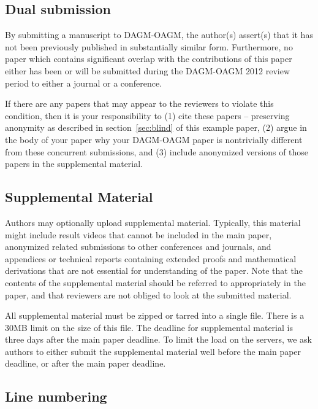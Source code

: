 \documentclass[runningheads]{llncs}
\begin{document}
\subsection{Dual submission}

By submitting a manuscript to DAGM-OAGM, the author(s) assert(s) that it has
not been previously published in substantially similar
form. Furthermore, no paper which contains significant overlap with
the contributions of this paper either has been or will be submitted
during the DAGM-OAGM 2012 review period to either a journal or a
conference.

If there are any papers that may appear to the reviewers to violate
this condition, then it is your responsibility to (1) cite these
papers -- preserving anonymity as described in section~\ref{sec:blind}
of this example paper, (2) argue in the body of your paper why your
DAGM-OAGM paper is nontrivially different from these concurrent
submissions, and (3) include anonymized versions of those papers in
the supplemental material.

\subsection{Supplemental Material} 

Authors may optionally upload supplemental material. Typically, this
material might include result videos that cannot be included in
the main paper, anonymized related submissions to other conferences
and journals, and appendices or technical reports containing extended
proofs and mathematical derivations that are not essential for
understanding of the paper. Note that the contents of the supplemental
material should be referred to appropriately in the paper, and that
reviewers are not obliged to look at the submitted material.

All supplemental material must be zipped or tarred into a single
file. There is a 30MB limit on the size of this file. The deadline for
supplemental material is three days after the main paper deadline. To
limit the load on the servers, we ask authors to either submit the
supplemental material well before the main paper deadline, or after
the main paper deadline.

\subsection{Line numbering}
\end{document}
